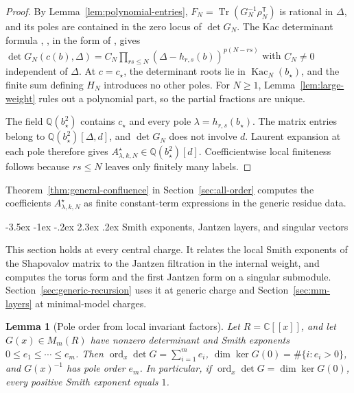 \documentclass[twoside,10pt]{article}
\makeatletter
\numberwithin{equation}{section}
\theoremstyle{slbody}
\newtheorem{lemma}[theorem]{Lemma}
\theoremstyle{definition}
\theoremstyle{remark}
\newcommand{\ord}{\operatorname{ord}}
\newcommand{\Tr}{\operatorname{Tr}}
\renewcommand{\section}{%
  \@startsection{section}{1}{\z@}%
    {-3.5ex \@plus -1ex \@minus -.2ex}%
    {2.3ex \@plus .2ex}%
    {\normalfont\large\bfseries}}
\makeatother
\begin{document}
\begin{proof}
By Lemma~\ref{lem:polynomial-entries},
\(F_N=\Tr(G_N^{-1}\rho_N^{\mathsf T})\) is rational in
\(\Delta\), and its poles are contained in the zero locus of
\(\det G_N\).  The Kac determinant formula
\cite{Kac1979}, \cite[\S3.2, Theorem~3.1]{FeiginFuchs1982}, in the form of
\cite[Theorem~4.2, (4.16) and (4.21)]{IoharaKoga2011}, gives
\(\det G_N(c(b),\Delta)=C_N\prod_{rs\leq N}(\Delta-h_{r,s}(b))^{p(N-rs)}\)
with \(C_N\neq0\) independent of \(\Delta\).  At \(c=c_\star\), the determinant
roots lie in \(\operatorname{Kac}_N(b_\star)\), and the finite sum defining \(H_N\)
introduces no other poles.  For \(N\geq1\), Lemma~\ref{lem:large-weight} rules
out a polynomial part, so the partial fractions are unique.

The field \(\mathbb Q(b_\star^2)\) contains \(c_\star\) and every pole
\(\lambda=h_{r,s}(b_\star)\).  The matrix entries belong to
\(\mathbb Q(b_\star^2)[\Delta,d]\), and \(\det G_N\) does not involve
\(d\).  Laurent expansion at each pole therefore gives
\(A^{\star}_{\lambda,k,N}\in\mathbb Q(b_\star^2)[d]\).
Coefficientwise local finiteness follows because \(rs\leq N\) leaves
only finitely many labels.
\end{proof}

Theorem~\ref{thm:general-confluence} in Section~\ref{sec:all-order}
computes the coefficients \(A^\star_{\lambda,k,N}\) as finite constant-term
expressions in the generic residue data.


\section{Smith exponents, Jantzen layers, and singular vectors}\label{sec:smith}

This section holds at every central charge.  It relates the local Smith
exponents of the Shapovalov matrix to the Jantzen filtration in the internal
weight, and computes the torus form and the first Jantzen form on a singular
submodule.  Section~\ref{sec:generic-recursion} uses it at generic charge
and Section~\ref{sec:mm-layers} at minimal-model charges.


\begin{lemma}[Pole order from local invariant factors]\label{lem:smith}
Let \(R=\mathbb C[[x]]\), and let \(G(x)\in M_m(R)\) have nonzero determinant
and Smith exponents \(0\leq e_1\leq\cdots\leq e_m\).  Then
\(\ord_x\det G=\sum_{i=1}^m e_i\), \(\dim\ker G(0)=\#\{i:e_i>0\}\), and
\(G(x)^{-1}\) has pole order \(e_m\).  In particular, if
\(\ord_x\det G=\dim\ker G(0)\), every positive Smith exponent equals \(1\).
\end{lemma}
\end{document}
